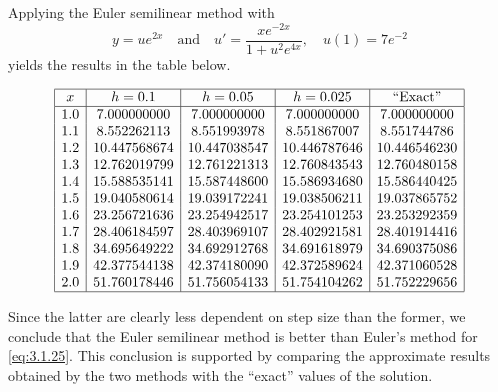 \documentclass{ximera}
\begin{document}
\begin{example}
Applying the Euler semilinear method
with
$$
y=ue^{2x}\quad\mbox{and}\quad u'=\frac{xe^{-2x}}{1+u^2e^{4x}},\quad
u(1)=7e^{-2}
$$
 yields the results in the table below.
 
 $$
\begin{array}{|c|c|c|c|c|}
\hline
x&
h=0.1&
h=0.05&
h=0.025&
\text{``Exact''} \\ \hline
1.0 &  7.000000000 &  7.000000000 &  7.000000000 &  7.000000000\\
1.1 &  8.552262113 &  8.551993978 &  8.551867007 &  8.551744786\\
1.2 & 10.447568674 & 10.447038547 & 10.446787646 & 10.446546230\\
1.3 & 12.762019799 & 12.761221313 & 12.760843543 & 12.760480158\\
1.4 & 15.588535141 & 15.587448600 & 15.586934680 & 15.586440425\\
1.5 & 19.040580614 & 19.039172241 & 19.038506211 & 19.037865752\\
1.6 & 23.256721636 & 23.254942517 & 23.254101253 & 23.253292359\\
1.7 & 28.406184597 & 28.403969107 & 28.402921581 & 28.401914416\\
1.8 & 34.695649222 & 34.692912768 & 34.691618979 & 34.690375086\\
1.9 & 42.377544138 & 42.374180090 & 42.372589624 & 42.371060528\\
2.0 & 51.760178446 & 51.756054133 & 51.754104262 & 51.752229656\\
\hline
\end{array}
$$
 
Since the latter are clearly less dependent on step size
than the former, we conclude that the Euler semilinear method
is better than Euler's method for \eqref{eq:3.1.25}. This conclusion
is supported by comparing the approximate results obtained by the
two methods with the ``exact'' values of the solution.
\end{example}
\end{document}
